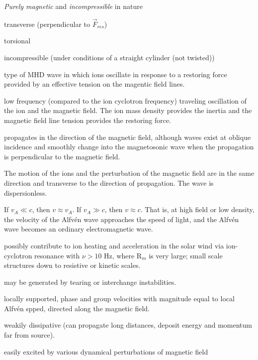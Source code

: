 \documentclass[12pt]{article}
\begin{document}
\begin{itemize*}
    \item \emph{Purely magnetic} and \emph{incompressible} in nature
    \item transverse (perpendicular to $\vec{F}_{res}$)
    \item torsional
    \item incompressible (under conditions of a straight cylinder (not twisted))
    \item type of MHD wave in which ions oscillate in response to a restoring
        force provided by an effective tension on the magentic field lines.
    \item low frequency (compared to the ion cyclotron frequency) traveling
        oscillation of the ion and the magnetic field. The ion mass
        density provides the inertia and the magnetic field line
        tension provides the restoring force.
    \item propagates in the direction of the magnetic field, although waves exist
        at oblique incidence and smoothly change into the magnetosonic wave
        when the propagation is perpendicular to the magnetic field.
    \item The motion of the ions and the perturbation of the magnetic
        field are in the same direction and transverse to the direction of
        propagation. The wave is dispersionless.
    \item If $v_{A} \ll c$, then $v \approx v_{A}$. If $v_{A} \gg c$,
        then $v \approx c$. That is, at high field or low density, the
        velocity of the Alfv\'en wave approaches the speed of light,
        and the Alfv\'en wave becomes an ordinary electromagnetic
        wave.
    \item possibly contribute to ion heating and acceleration in the solar
        wind via ion-cyclotron resonance with $ \nu > 10$ Hz, where R$_m$ is
        very large; small scale structures down to resistive or kinetic scales.
    \item may be generated by tearing or interchange instabilities.
    \item locally supported, phase and group velocities with magnitude equal to
        local Alfv\'en spped, directed along the magnetic field.
    \item weakily dissipative (can propagate long distances, deposit energy
        and momentum far from source).
    \item easily excited by various dynamical perturbations of magnetic field

\end{itemize*}
\end{document}
